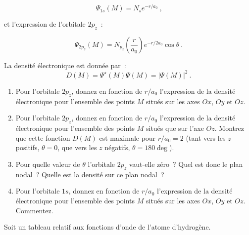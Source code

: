 $$
\Psi_{1s}(M)=N_s e^{-r/a_0} \ \text{,}
$$

et l'expression de l'orbitale $2p_z$~: 

$$
\Psi_{2p_z}(M)=
N_{p_z}\left(\frac{r}{a_0}\right)e^{-r/2a_0}\cos{\theta} \ .
$$

La densit\'e \'electronique est donn\'ee par~:
$$
D(M)=\Psi^\star(M)\Psi(M)=|\Psi(M)|^2  \ .
$$

\begin{enumerate}

\item Pour l'orbitale $2p_z$, donnez en fonction de $r/a_0$ l'expression de la 
densit\'e \'electronique pour l'ensemble des points $M$ situ\'es sur les axes $Ox$, $Oy$ et $Oz$.

\item Pour l'orbitale $2p_z$, donnez en fonction de $r/a_0$ l'expression de la 
densit\'e \'electronique pour l'ensemble des points $M$ situ\'es que sur l'axe $Oz$. 
Montrez que cette fonction $D(M)$ est maximale pour $r/a_0=2$ 
(tant vers les $z$ positifs, $\theta=0$, que vers les $z$ n\'egatifs, $\theta=180\deg$).

\item Pour quelle valeur de $\theta$ l'orbitale $2p_z$ vaut-elle z\'ero~? Quel est donc le plan nodal~?
Quelle est la densit\'e sur ce plan nodal~?

\item Pour l'orbitale $1s$, donnez en fonction de $r/a_0$ l'expression de la densit\'e 
\'electronique pour l'ensemble des points $M$ situ\'es sur les axes $Ox$, $Oy$ et $Oz$. 
Commentez.
\end{enumerate}

%

Soit un tableau relatif aux fonctions d'onde de l'atome d'hydrog\`ene.

